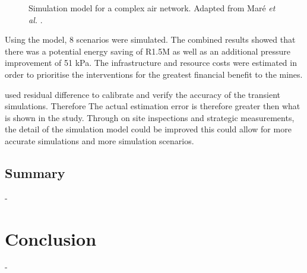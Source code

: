   \begin{figure}[h!]
  	\centering
  	\caption[Simulation model for a complex air network.]{Simulation model for a complex air network. Adapted from Maré \textit{et al.} \cite{Mare2017Evaluating}.}
  	\label{fig:Mare model}
  \end{figure}
\par 
Using the model, 8 scenarios were simulated. The combined results showed that there was a potential energy saving of R1.5M as well as an additional pressure improvement of 51 kPa. The infrastructure and resource costs were estimated in order to prioritise the interventions for the greatest financial benefit to the mines.	
\par
	\cite{Mare2017Evaluating} used residual difference to calibrate and verify the accuracy of the transient simulations. Therefore The actual estimation error is therefore greater then what is shown in the study. Through on site inspections and strategic measurements, the detail of the simulation model could be improved this could allow for more accurate simulations and more simulation scenarios.
	\subsection{Summary}
	-
	\label{Shortcomings of previous work}
\section{Conclusion}-